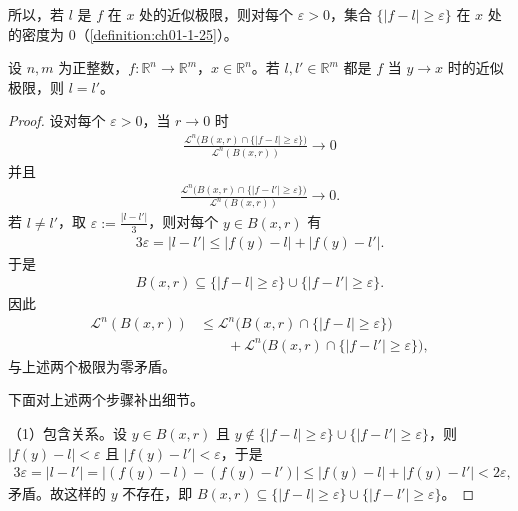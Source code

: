 \documentclass[../../main.tex]{subfiles}%
\begin{document}
所以，若 $l$ 是 $f$ 在 $x$ 处的近似极限，则对每个 $\varepsilon>0$，集合 $\{\lvert f-l\rvert\geqslant\varepsilon\}$ 在 $x$ 处的密度为 $0$（\cref{definition:ch01-1-25}）。%

\begin{theorem}[近似极限的唯一性]\label{theorem:ch01-1-36}
设 $n,m$ 为正整数，$f:\mathbb{R}^n\to\mathbb{R}^m$，$x\in\mathbb{R}^n$。若 $l,l'\in\mathbb{R}^m$ 都是 $f$ 当 $y\to x$ 时的近似极限，则 $l=l'$。
\end{theorem}

\begin{proof}
设对每个 $\varepsilon>0$，当 $r\to0$ 时
\begin{align*}
\frac{\mathcal{L}^{n}\bigl(B(x,r)\cap\{\lvert f-l\rvert\geqslant\varepsilon\}\bigr)}{\mathcal{L}^{n}(B(x,r))}\to0
\end{align*}
并且
\begin{align*}
\frac{\mathcal{L}^{n}\bigl(B(x,r)\cap\{\lvert f-l'\rvert\geqslant\varepsilon\}\bigr)}{\mathcal{L}^{n}(B(x,r))}\to0 .
\end{align*}
若 $l\neq l'$，取 $\varepsilon:=\frac{\lvert l-l'\rvert}{3}$，则对每个 $y\in B(x,r)$ 有
\begin{align*}
3\varepsilon=\lvert l-l'\rvert\leqslant\lvert f(y)-l\rvert+\lvert f(y)-l'\rvert .
\end{align*}
于是
\begin{align*}
B(x,r)\subseteq\{\lvert f-l\rvert\geqslant\varepsilon\}\cup\{\lvert f-l'\rvert\geqslant\varepsilon\} .
\end{align*}
因此
\begin{align*}
\mathcal{L}^{n}(B(x,r))&\leqslant\mathcal{L}^{n}\bigl(B(x,r)\cap\{\lvert f-l\rvert\geqslant\varepsilon\}\bigr)\\
&\qquad+\mathcal{L}^{n}\bigl(B(x,r)\cap\{\lvert f-l'\rvert\geqslant\varepsilon\}\bigr),
\end{align*}
与上述两个极限为零矛盾。

下面对上述两个步骤补出细节。

（1）包含关系。设 $y\in B(x,r)$ 且 $y\notin\{\lvert f-l\rvert\geqslant\varepsilon\}\cup\{\lvert f-l'\rvert\geqslant\varepsilon\}$，则 $\lvert f(y)-l\rvert<\varepsilon$ 且 $\lvert f(y)-l'\rvert<\varepsilon$，于是
\begin{align*}
3\varepsilon=\lvert l-l'\rvert=\lvert(f(y)-l)-(f(y)-l')\rvert\leqslant\lvert f(y)-l\rvert+\lvert f(y)-l'\rvert<2\varepsilon ,
\end{align*}
矛盾。故这样的 $y$ 不存在，即 $B(x,r)\subseteq\{\lvert f-l\rvert\geqslant\varepsilon\}\cup\{\lvert f-l'\rvert\geqslant\varepsilon\}$。


\end{proof}
\end{document}

